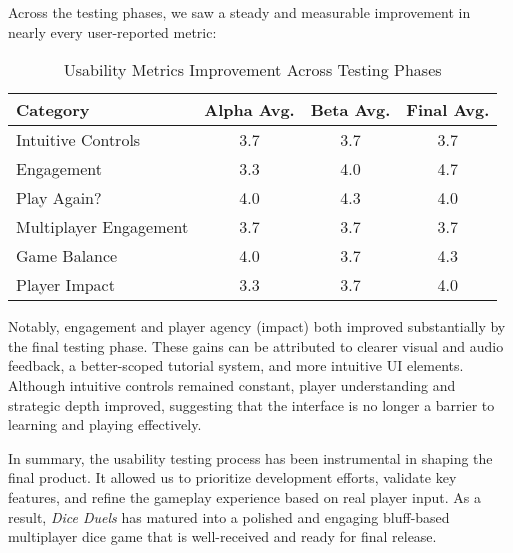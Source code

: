 \documentclass[12pt, titlepage]{article}
\begin{document}
Across the testing phases, we saw a steady and measurable improvement in nearly every user-reported metric:

\begin{table}[H]
\centering
\caption{Usability Metrics Improvement Across Testing Phases}
\begin{tabular}{|l|c|c|c|}
\hline
\textbf{Category} & \textbf{Alpha Avg.} & \textbf{Beta Avg.} & \textbf{Final Avg.} \\
\hline
Intuitive Controls & 3.7 & 3.7 & 3.7 \\
Engagement & 3.3 & 4.0 & 4.7 \\
Play Again? & 4.0 & 4.3 & 4.0 \\
Multiplayer Engagement & 3.7 & 3.7 & 3.7 \\
Game Balance & 4.0 & 3.7 & 4.3 \\
Player Impact & 3.3 & 3.7 & 4.0 \\
\hline
\end{tabular}
\end{table}

Notably, engagement and player agency (impact) both improved substantially by the final testing phase. These gains can be attributed to clearer visual and audio feedback, a better-scoped tutorial system, and more intuitive UI elements. Although intuitive controls remained constant, player understanding and strategic depth improved, suggesting that the interface is no longer a barrier to learning and playing effectively.

In summary, the usability testing process has been instrumental in shaping the final product. It allowed us to prioritize development efforts, validate key features, and refine the gameplay experience based on real player input. As a result, \textit{Dice Duels} has matured into a polished and engaging bluff-based multiplayer dice game that is well-received and ready for final release.
\end{document}
